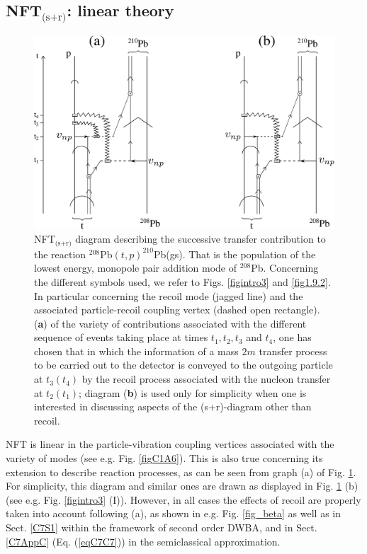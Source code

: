\begin{subappendices}
\section{NFT$_{\text{(s+r)}}$: linear theory}\label{App1C3}
\begin{figure}
\centerline {
\includegraphics*[width=15cm]{introduccion/figs/fig1_C_2}
}
\caption[NFT$_{\text{(s+r)}}$ diagram describing the successive transfer contribution to the reaction $^{208}$Pb$(t,p)^{210}$Pb(gs).]{ NFT$_{\text{(s+r)}}$ diagram describing the successive transfer contribution to the reaction $^{208}$Pb$(t,p)^{210}$Pb(gs). That is the population of the lowest energy, monopole pair addition mode of $^{208}$Pb. Concerning the different symbols used, we refer to Figs. \ref{figintro3} and \ref{fig1.9.2}. In particular concerning the recoil mode (jagged line) and the associated particle-recoil  coupling vertex (dashed open rectangle). (\textbf{a}) of the variety of contributions associated with the different sequence of events taking place  at times $t_1,t_2,t_3$ and $t_4$, one has chosen that in which the information of a mass $2m$ transfer process to be carried out to the detector is conveyed to the outgoing particle at $t_3(t_4)$ by the recoil process associated with the nucleon transfer at $t_2(t_1)$; diagram (\textbf{b}) is used only for simplicity when one is interested in discussing aspects of the (s+r)-diagram other than recoil.}
\label{fig1.C.2}
\end{figure}
NFT is linear in the  particle-vibration coupling vertices associated with the variety of modes (see e.g. Fig. \ref{figC1A6}).  This is also true concerning its extension to describe reaction processes, as can be seen from graph (a) of Fig. \ref{fig1.C.2}. For simplicity, this diagram and similar ones are drawn as displayed in Fig. \ref{fig1.C.2} (b) (see e.g. Fig. \ref{figintro3} (I)). However, in all cases the effects of recoil are properly taken into account following (a), as shown in e.g. Fig. \ref{fig_beta} as well as in Sect. \ref{C7S1} within the framework of second order DWBA, and in Sect. \ref{C7AppC} (Eq. (\ref{eqC7C7})) in the semiclassical approximation.

\end{subappendices}
